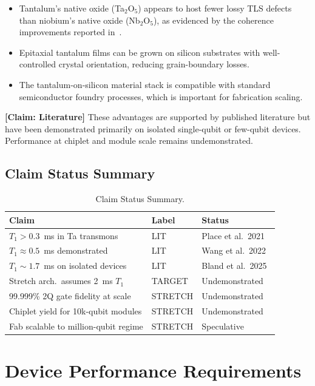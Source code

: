 \documentclass[conference]{IEEEtran}
\begin{document}
\begin{itemize}
\item Tantalum's native oxide (Ta$_2$O$_5$) appears to host fewer lossy TLS defects than niobium's native oxide (Nb$_2$O$_5$), as evidenced by the coherence improvements reported in~\cite{place2021, wang2022, bland2025}.
\item Epitaxial tantalum films can be grown on silicon substrates with well-controlled crystal orientation, reducing grain-boundary losses.
\item The tantalum-on-silicon material stack is compatible with standard semiconductor foundry processes, which is important for fabrication scaling.
\end{itemize}

\textbf{[Claim: Literature]} These advantages are supported by published literature but have been demonstrated primarily on isolated single-qubit or few-qubit devices. Performance at chiplet and module scale remains undemonstrated.

\subsection{Claim Status Summary}

\begin{table}[htbp]
\centering
\caption{Claim Status Summary.}
\label{tab:claims}
\begin{tabular}{lll}
\toprule
\textbf{Claim} & \textbf{Label} & \textbf{Status} \\
\midrule
$T_1 > 0.3$~ms in Ta transmons & LIT & Place et al.\ 2021~\cite{place2021} \\
$T_1 \approx 0.5$~ms demonstrated & LIT & Wang et al.\ 2022~\cite{wang2022} \\
$T_1 \sim 1.7$~ms on isolated devices & LIT & Bland et al.\ 2025~\cite{bland2025} \\
Stretch arch.\ assumes 2~ms $T_1$ & TARGET & Undemonstrated \\
99.999\% 2Q gate fidelity at scale & STRETCH & Undemonstrated \\
Chiplet yield for 10k-qubit modules & STRETCH & Undemonstrated \\
Fab scalable to million-qubit regime & STRETCH & Speculative \\
\bottomrule
\end{tabular}
\end{table}

\section{Device Performance Requirements}
\end{document}
